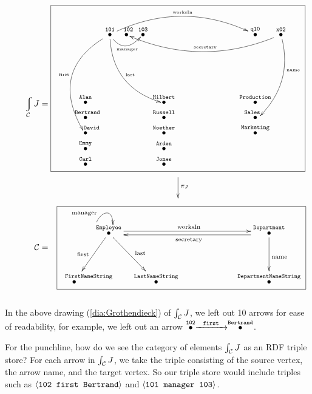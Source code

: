 \begin{application}
\begin{align}\label{dia:Grothendieck}
\hspace{0in}\varint_\mcC J=\parbox{3.9in}{
\fbox{
\xymatrix@=.1pt{
&\LTO{101}\ar@/_2.5pc/[ddddl]+<-3pt,3pt>_{\tin{first}}\ar@/_1.5pc/[ddrrr]+<-4pt,0pt>^{\tin{last}}\ar@/_1pc/[rr]+<-3pt,-3pt>_-{\tin{manager}}\ar@/^1.8pc/[rrrrrr]^{\tin{worksIn}}&\LTO{\;\;102}&\LTO{103}&&&&\LTO{q10}&\LTO{x02}\ar@/^1.6pc/[llllll]+<4pt,-2pt>_{\tin{secretary}}\ar@/^1.2pc/[lddd]+<6pt,2pt>^(.4){\tin{name}}\\\parbox{.1in}{~\\\vspace{.6in}~}\\\LTO{Alan}&&&&\LTO{Hilbert}&\hspace{.4in}&\hspace{.4in}&\LTO{Production}\\\LTO{\;\;Bertrand}&&&&\LTO{Russell}&&&\LTO{\hspace{-.1in}Sales}\\\LTO{\hspace{.2in}David}&&&&\LTO{Noether}&&&\LTO{Marketing}\\\LTO{Emmy}&&&&\LTO{Arden}\\\LTO{Carl}&&&&\LTO{Jones}}}\\
\xymatrix{\hspace{1.6in}&\ar[d]^{\pi_J}\\&~}}\\
\nonumber \mcC=\parbox{3.9in}{\hspace{.1in}\fbox{
			\xymatrix@=9pt{&\LTO{Employee}\ar@<.5ex>[rrrrr]^{\tn{worksIn}}\ar@(l,u)[]+<5pt,10pt>^{\tn{manager}}\ar[dddl]_{\tn{first}}\ar[dddr]^{\tn{last}}&&&\hspace{0in}&&\LTO{Department}\ar@<.5ex>[lllll]^{\tn{secretary}}\ar[ddd]^{\tn{name}}\\\\\\\LTO{\parbox{.3in}{\tt \scriptsize FirstNameString}}&&\LTO{LastNameString}&~&~&~&\LTO{DepartmentNameString}
			}}}
\end{align}~\\

In the above drawing (\ref{dia:Grothendieck}) of $\int_\mathcal{C} J$, we left out 10 arrows for ease of readability, for example, we left out an arrow $\stackrel{\tt{102}}{\bullet}\xrightarrow{\ \ \tt first\ \ }\stackrel{\tt{Bertrand}}{\bullet}$.

For the punchline, how do we see the category of elements $\int_\mathcal{C} J$ as an RDF triple store? For each arrow in $\int_\mathcal{C} J$, we take the triple consisting of the source vertex, the arrow name, and the target vertex. So our triple store would include triples such as $\langle{\tt 102\;\; first\;\; Bertrand}\rangle$ and $\langle{\tt 101\;\; manager\;\; 103}\rangle$.

\end{application}

